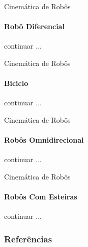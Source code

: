\documentclass[aspectratio=169]{beamer}
\begin{document}
\begin{frame}{Cinemática de Robôs}
    \framesubtitle{Robô Diferencial}
    continuar ...
\end{frame}

\begin{frame}{Cinemática de Robôs}
    \framesubtitle{Biciclo}
    continuar ...
\end{frame}

\begin{frame}{Cinemática de Robôs}
    \framesubtitle{Robôs Omnidirecional}
    continuar ...
\end{frame}

\begin{frame}{Cinemática de Robôs}
    \framesubtitle{Robôs Com Esteiras}
    continuar ...
\end{frame}

  
\begin{frame}[t, allowframebreaks]
	\frametitle{Referências}
	
\end{frame}
  
\end{document}

